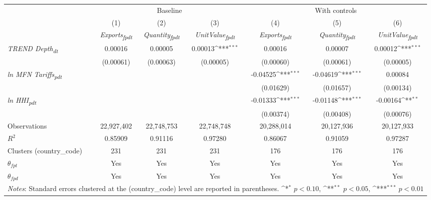 {
\def\sym#1{\ifmmode^{#1}\else\(^{#1}\)\fi}
\begin{tabular}{l*{6}{c}}
\toprule
&\multicolumn{3}{c}{Baseline}&\multicolumn{3}{c}{With controls}\\\cmidrule(lr){2-4}\cmidrule(lr){5-7}
&(1)&(2)&(3)&(4)&(5)&(6)\\
&\textit{Exports\textsubscript{fpdt}}&\textit{Quantity\textsubscript{fpdt}}&\textit{UnitValue\textsubscript{fpdt}}&\textit{Exports\textsubscript{fpdt}}&\textit{Quantity\textsubscript{fpdt}}&\textit{UnitValue\textsubscript{fpdt}}\\
\midrule
\textit{TREND Depth\textsubscript{dt}} & 0.00016 & 0.00005 & 0.00013\sym{***} & 0.00016 & 0.00007 & 0.00012\sym{***}\\
 & (0.00061) & (0.00063) & (0.00005) & (0.00060) & (0.00061) & (0.00005)\\
\addlinespace
\textit{ln MFN Tariffs\textsubscript{pdt}} &  &  &  & -0.04525\sym{***} & -0.04619\sym{***} & 0.00084\\
 &  &  &  & (0.01629) & (0.01657) & (0.00134)\\
\addlinespace
\textit{ln HHI\textsubscript{pdt}} &  &  &  & -0.01333\sym{***} & -0.01148\sym{***} & -0.00164\sym{**}\\
 &  &  &  & (0.00374) & (0.00408) & (0.00076)\\
\midrule
Observations & 22,927,402 & 22,748,753 & 22,748,748 & 20,288,014 & 20,127,936 & 20,127,933\\
$R^{2}$ & 0.85909 & 0.91116 & 0.97280 & 0.86067 & 0.91059 & 0.97287\\
Clusters (country_code) & 231 & 231 & 231 & 176 & 176 & 176\\
$\theta_{fpt}$ & Yes & Yes & Yes & Yes & Yes & Yes\\
$\theta_{fpd}$ & Yes & Yes & Yes & Yes & Yes & Yes\\
\bottomrule
\multicolumn{7}{l}{\footnotesize \textit{Notes}: Standard errors clustered at the (country_code) level are reported in parentheses. \sym{*} \(p<0.10\), \sym{**} \(p<0.05\), \sym{***} \(p<0.01\)}\\
\end{tabular}
}
